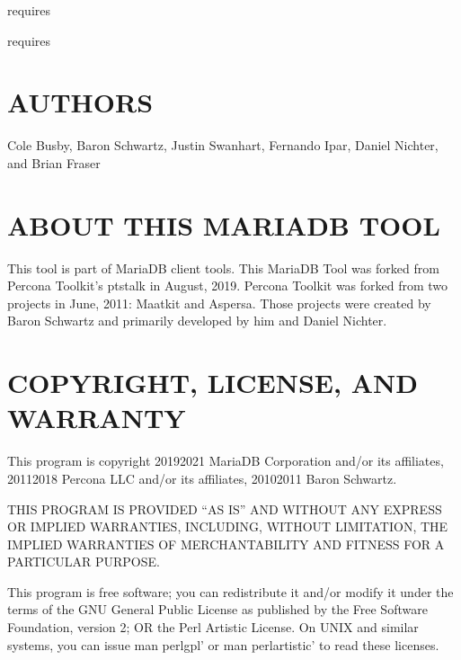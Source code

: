 \documentclass[letterpaper,10pt,english]{sphinxmanual}
\begin{document}
{\hyperref[\detokenize{mariadb-stat:cmdoption-mariadb-stat-collect-strace}]{}} requires 

{\hyperref[\detokenize{mariadb-stat:cmdoption-mariadb-stat-collect-tcpdump}]{}} requires 


\section{AUTHORS}
\label{\detokenize{mariadb-stat:authors}}
Cole Busby, Baron Schwartz, Justin Swanhart, Fernando Ipar, Daniel Nichter,
and Brian Fraser


\section{ABOUT THIS MARIADB TOOL}
\label{\detokenize{mariadb-stat:about-this-mariadb-tool}}
This tool is part of MariaDB client tools. This MariaDB Tool was forked from
Percona Toolkit’s pt\sphinxhyphen{}stalk in August, 2019. Percona Toolkit was forked from two
projects in June, 2011: Maatkit and Aspersa.  Those projects were created by
Baron Schwartz and primarily developed by him and Daniel Nichter.


\section{COPYRIGHT, LICENSE, AND WARRANTY}
\label{\detokenize{mariadb-stat:copyright-license-and-warranty}}
This program is copyright 2019\sphinxhyphen{}2021 MariaDB Corporation and/or its affiliates,
2011\sphinxhyphen{}2018 Percona LLC and/or its affiliates, 2010\sphinxhyphen{}2011 Baron Schwartz.

THIS PROGRAM IS PROVIDED “AS IS” AND WITHOUT ANY EXPRESS OR IMPLIED
WARRANTIES, INCLUDING, WITHOUT LIMITATION, THE IMPLIED WARRANTIES OF
MERCHANTABILITY AND FITNESS FOR A PARTICULAR PURPOSE.

This program is free software; you can redistribute it and/or modify it under
the terms of the GNU General Public License as published by the Free Software
Foundation, version 2; OR the Perl Artistic License.  On UNIX and similar
systems, you can issue \textasciigrave{}man perlgpl’ or \textasciigrave{}man perlartistic’ to read these
licenses.
\end{document}
